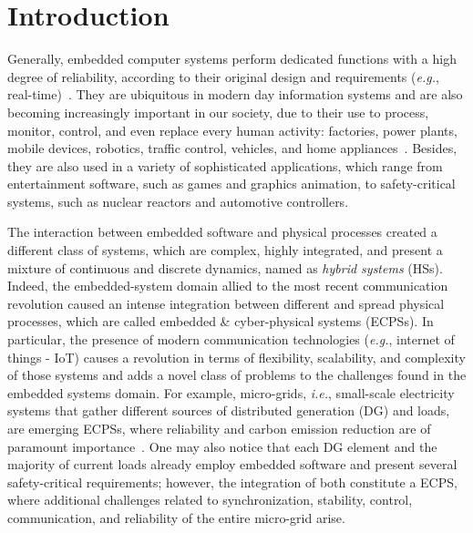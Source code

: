 \documentclass[format=acmsmall, review=false, screen=true]{acmart}
\begin{document}


\maketitle

\section{Introduction}

Generally, embedded computer systems perform dedicated functions with a high degree of reliability, according to their original design and requirements ({\it e.g.}, real-time)~\cite{Kopetz11}. They are ubiquitous in modern day information systems and are also becoming increasingly important in our society, due to their use to process, monitor, control, and even replace every human activity: factories, power plants, mobile devices, robotics, traffic control, vehicles, and home appliances~\cite{xu15}. Besides, they are also used in a variety of sophisticated applications, which range from entertainment software, such as games and graphics animation, to safety-critical systems, such as nuclear reactors and automotive controllers. 

The interaction between embedded software and physical processes created a different class of systems, which are complex, highly integrated, and present a mixture of continuous and discrete dynamics, named as \textit{hybrid systems} (HSs). Indeed, the embedded-system domain allied to the most recent communication revolution caused an intense integration between different and spread physical processes, which are called embedded \& cyber-physical systems (ECPSs). In particular, the presence of modern communication technologies ({\it e.g.}, internet of things - IoT) causes a revolution in terms of flexibility, scalability, and complexity of those systems and adds a novel class of problems to the challenges found in the embedded systems domain. For example, micro-grids, {\it i.e.}, small-scale electricity systems that gather different sources of distributed generation (DG) and loads, are emerging ECPSs, where reliability and carbon emission reduction are of paramount importance~\cite{xu15}. One may also notice that each DG element and the majority of current loads already employ embedded software and present several safety-critical requirements; however, the integration of both constitute a ECPS, where additional challenges related to synchronization, stability, control, communication, and reliability of the entire micro-grid arise.
\end{document}
